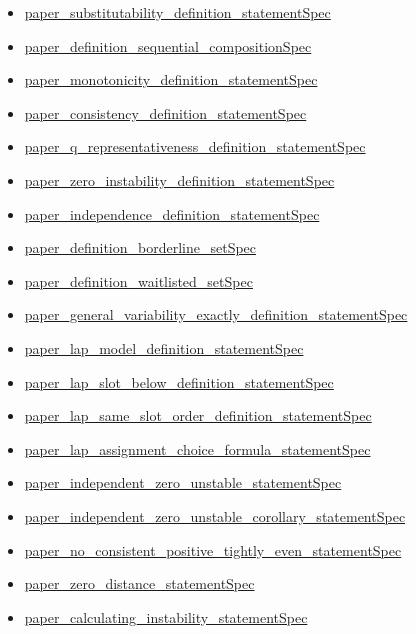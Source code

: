 \documentclass[10pt]{article}
\begin{document}
\begin{itemize}[leftmargin=1.2em]
\begin{itemize}[leftmargin=1.2em]
\item \hyperlink{source-claim-d17644eda5ebe53f}{paper\_substitutability\_definition\_statementSpec}
\item \hyperlink{source-claim-69b86836fa7d4d06}{paper\_definition\_sequential\_compositionSpec}
\item \hyperlink{source-claim-1b6dc1033989d2bf}{paper\_monotonicity\_definition\_statementSpec}
\item \hyperlink{source-claim-899ae3aec5210e2c}{paper\_consistency\_definition\_statementSpec}
\item \hyperlink{source-claim-ca1d4873227a50e3}{paper\_q\_representativeness\_definition\_statementSpec}
\item \hyperlink{source-claim-3a97b71dd915eed1}{paper\_zero\_instability\_definition\_statementSpec}
\item \hyperlink{source-claim-e633cfedc7bfb493}{paper\_independence\_definition\_statementSpec}
\item \hyperlink{source-claim-8e553b3e026d261e}{paper\_definition\_borderline\_setSpec}
\item \hyperlink{source-claim-1c2136cbe341a833}{paper\_definition\_waitlisted\_setSpec}
\item \hyperlink{source-claim-d2f6a286dc057af6}{paper\_general\_variability\_exactly\_definition\_statementSpec}
\item \hyperlink{source-claim-a009d7013e95842d}{paper\_lap\_model\_definition\_statementSpec}
\item \hyperlink{source-claim-f902fe2aa64a28cb}{paper\_lap\_slot\_below\_definition\_statementSpec}
\item \hyperlink{source-claim-ac931f819ad35103}{paper\_lap\_same\_slot\_order\_definition\_statementSpec}
\item \hyperlink{source-claim-be70d394f2bee79c}{paper\_lap\_assignment\_choice\_formula\_statementSpec}
\item \hyperlink{source-claim-b05952c99a84b6af}{paper\_independent\_zero\_unstable\_statementSpec}
\item \hyperlink{source-claim-d920f9b7847b2baa}{paper\_independent\_zero\_unstable\_corollary\_statementSpec}
\item \hyperlink{source-claim-18a641b7c4365d27}{paper\_no\_consistent\_positive\_tightly\_even\_statementSpec}
\item \hyperlink{source-claim-1daa198b9d0a1bc3}{paper\_zero\_distance\_statementSpec}
\item \hyperlink{source-claim-760d01f2c31e3672}{paper\_calculating\_instability\_statementSpec}

\end{itemize}
\end{itemize}
\end{document}
